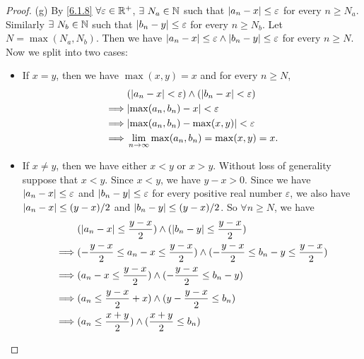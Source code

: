 \begin{proof}{(g)}
  By \cref{6.1.8} \(\forall \varepsilon \in \mathbb{R}^+\), \(\exists\ N_a \in \mathbb{N}\) such that \(\left\lvert a_n - x\right\rvert \leq \varepsilon\) for every \(n \geq N_a\).
  Similarly \(\exists\ N_b \in \mathbb{N}\) such that \(\left\lvert b_n - y\right\rvert \leq \varepsilon\) for every \(n \geq N_b\).
  Let \(N = \max(N_a, N_b)\).
  Then we have \(\left\lvert a_n - x\right\rvert \leq \varepsilon \land \left\lvert b_n - y\right\rvert \leq \varepsilon\) for every \(n \geq N\).
  Now we split into two cases:
  \begin{itemize}
    \item If \(x = y\), then we have \(\max(x, y) = x\) and for every \(n \geq N\),
          \begin{align*}
                     & (\abs{a_n - x} < \varepsilon) \land (\abs{b_n - x} < \varepsilon) \\
            \implies & \abs{\max(a_n, b_n) - x} < \varepsilon                            \\
            \implies & \abs{\max(a_n, b_n) - \max(x, y)} < \varepsilon                   \\
            \implies & \lim_{n \to \infty} \max(a_n, b_n) = \max(x, y) = x.
          \end{align*}
    \item If \(x \neq y\), then we have either \(x < y\) or \(x > y\).
          Without loss of generality suppose that \(x < y\).
          Since \(x < y\), we have \(y - x > 0\).
          Since we have \(\left\lvert a_n - x\right\rvert \leq \varepsilon\) and \(\left\lvert b_n - y\right\rvert \leq \varepsilon\) for every positive real number \(\varepsilon\), we also have \(\left\lvert a_n - x\right\rvert \leq (y - x) / 2\) and \(\left\lvert b_n - y\right\rvert \leq (y - x) / 2\).
          So \(\forall n \geq N\), we have
          \begin{align*}
                     & (\abs{a_n - x} \leq \dfrac{y - x}{2}) \land (\abs{b_n - y} \leq \dfrac{y - x}{2})                                   \\
            \implies & (-\dfrac{y - x}{2} \leq a_n - x \leq \dfrac{y - x}{2}) \land (-\dfrac{y - x}{2} \leq b_n - y \leq \dfrac{y - x}{2}) \\
            \implies & (a_n - x \leq \dfrac{y - x}{2}) \land (-\dfrac{y - x}{2} \leq b_n - y)                                              \\
            \implies & (a_n \leq \dfrac{y - x}{2} + x) \land (y - \dfrac{y - x}{2} \leq b_n)                                               \\
            \implies & (a_n \leq \dfrac{x + y}{2}) \land (\dfrac{x + y}{2} \leq b_n)                                                       \\

\end{align*}
\end{itemize}
\end{proof}
